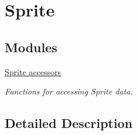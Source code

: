 \hypertarget{group____sprite}{\section{Sprite}
\label{group____sprite}
}
\subsection*{Modules}
\begin{DoxyCompactItemize}
\item 
\hyperlink{group____sprite__accessors}{Sprite accessors}
\begin{DoxyCompactList}\small\item\em Functions for accessing Sprite data. \end{DoxyCompactList}\end{DoxyCompactItemize}


\subsection{Detailed Description}

